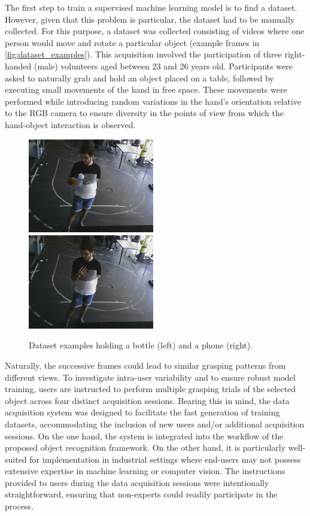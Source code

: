 The first step to train a supervised machine learning model is to find a dataset. However, given that this problem is particular, the dataset had to be manually collected. For this purpose, a dataset was collected consisting of videos where one person would move and rotate a particular object (example frames in \autoref{fig:dataset_examples}). This acquisition involved the participation of three right-handed (male) volunteers aged between 23 and 26 years old. Participants were asked to naturally grab and hold an object placed on a table, followed by executing small movements of the hand in free space. These movements were performed while introducing random variations in the hand’s orientation relative to the RGB camera to ensure diversity in the points of view from which the hand-object interaction is observed.

\begin{figure}[ht]
    \centerline{\includegraphics[width=0.49\textwidth]{figs/dataset_preprocessing1_1.png} \ \includegraphics[width=0.49\textwidth]{figs/dataset_preprocessing1_2.png}}
    \caption{Dataset examples holding a bottle (left) and a phone (right).}
    \label{fig:dataset_examples}
\end{figure}

Naturally, the successive frames could lead to similar grasping patterns from different views. To investigate intra-user variability and to ensure robust model training, users are instructed to perform multiple grasping trials of the selected object across four distinct acquisition sessions. Bearing this in mind, the data acquisition system was designed to facilitate the fast generation of training datasets, accommodating the inclusion of new users and/or additional acquisition sessions. On the one hand, the system is integrated into the workflow of the proposed object recognition framework. On the other hand, it is particularly well-suited for implementation in industrial settings where end-users may not possess extensive expertise in machine learning or computer vision. The instructions provided to users during the data acquisition sessions were intentionally straightforward, ensuring that non-experts could readily participate in the process.


